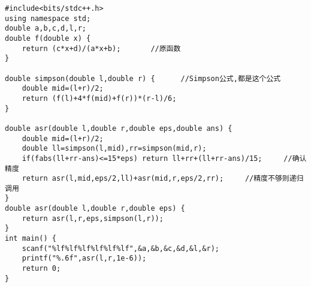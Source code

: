\begin{lstlisting}
#include<bits/stdc++.h>
using namespace std;
double a,b,c,d,l,r;
double f(double x) {
	return (c*x+d)/(a*x+b);       //原函数
}

double simpson(double l,double r) {      //Simpson公式,都是这个公式
	double mid=(l+r)/2;
	return (f(l)+4*f(mid)+f(r))*(r-l)/6;
}

double asr(double l,double r,double eps,double ans) {
	double mid=(l+r)/2;
	double ll=simpson(l,mid),rr=simpson(mid,r);
	if(fabs(ll+rr-ans)<=15*eps) return ll+rr+(ll+rr-ans)/15;     //确认精度
	return asr(l,mid,eps/2,ll)+asr(mid,r,eps/2,rr);     //精度不够则递归调用
}
double asr(double l,double r,double eps) {
	return asr(l,r,eps,simpson(l,r));
}
int main() {
	scanf("%lf%lf%lf%lf%lf%lf",&a,&b,&c,&d,&l,&r);
	printf("%.6f",asr(l,r,1e-6));
	return 0;
}
\end{lstlisting}

